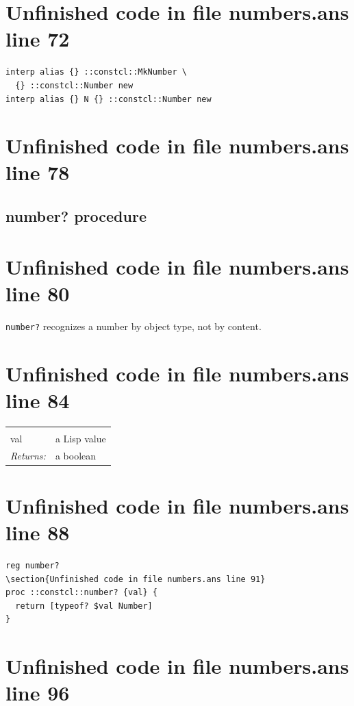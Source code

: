 \documentclass[twoside,9pt]{report}
\begin{document}
\section{Unfinished code in file numbers.ans line 72}
\begin{lstlisting}
interp alias {} ::constcl::MkNumber \
  {} ::constcl::Number new
interp alias {} N {} ::constcl::Number new
\end{lstlisting}
\section{Unfinished code in file numbers.ans line 78}
\subsection{number? procedure}
\label{number?-procedure}
\section{Unfinished code in file numbers.ans line 80}


\texttt{number?} recognizes a number by object type, not by content.

\section{Unfinished code in file numbers.ans line 84}
\noindent\begin{tabular}{ |p{1.9cm} p{8cm}| }
\hline
\rowcolor[HTML]{CCCCCC} \multicolumn{2}{|l|}{\bf number? (public)} \\
val & a Lisp value \\
\textit{Returns:} & a boolean \\
\hline
\end{tabular}
\section{Unfinished code in file numbers.ans line 88}
\begin{lstlisting}
reg number?
\section{Unfinished code in file numbers.ans line 91}
proc ::constcl::number? {val} {
  return [typeof? $val Number]
}
\end{lstlisting}
\section{Unfinished code in file numbers.ans line 96}
\end{document}
